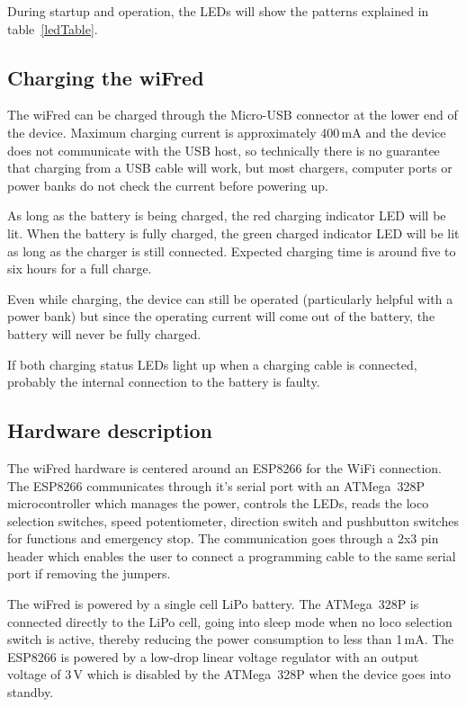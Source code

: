 \documentclass[11pt,a4paper]{scrartcl}
\begin{document}
During startup and operation, the LEDs will show the patterns explained in table~\ref{ledTable}.

\subsection{Charging the wiFred}

The wiFred can be charged through the Micro-USB connector at the lower end of the device. Maximum charging current is approximately 400\,mA and the device does not communicate with the USB host, so technically there is no guarantee that charging from a USB cable will work, but most chargers, computer ports or power banks do not check the current before powering up.

As long as the battery is being charged, the red charging indicator LED will be lit. When the battery is fully charged, the green charged indicator LED will be lit as long as the charger is still connected. Expected charging time is around five to six hours for a full charge.

Even while charging, the device can still be operated (particularly helpful with a power bank) but since the operating current will come out of the battery, the battery will never be fully charged.

If both charging status LEDs light up when a charging cable is connected, probably the internal connection to the battery is faulty.

\subsection{Hardware description}

The wiFred hardware is centered around an ESP8266 for the WiFi connection. The ESP8266 communicates through it's serial port with an ATMega~328P microcontroller which manages the power, controls the LEDs, reads the loco selection switches, speed potentiometer, direction switch and pushbutton switches for functions and emergency stop. The communication goes through a 2x3 pin header which enables the user to connect a programming cable to the same serial port if removing the jumpers.

The wiFred is powered by a single cell LiPo battery. The ATMega~328P is connected directly to the LiPo cell, going into sleep mode when no loco selection switch is active, thereby reducing the power consumption to less than 1\,mA. The ESP8266 is powered by a low-drop linear voltage regulator with an output voltage of 3\,V which is disabled by the ATMega~328P when the device goes into standby.
\end{document}
